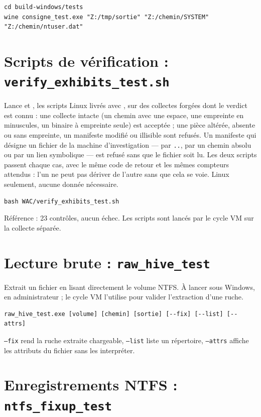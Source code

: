 \documentclass[11pt,a4paper,oneside]{report}
\begin{document}
\begin{lstlisting}
cd build-windows/tests
wine consigne_test.exe "Z:/tmp/sortie" "Z:/chemin/SYSTEM" "Z:/chemin/ntuser.dat"
\end{lstlisting}

\section{Scripts de vérification : \texttt{verify\_exhibits\_test.sh}}

Lance  et , les
scripts Linux livrés avec , sur des collectes forgées dont le
verdict est connu : une collecte intacte (un chemin avec une espace, une
empreinte en minuscules, un binaire à empreinte seule) est acceptée ; une pièce
altérée, absente ou sans empreinte, un manifeste modifié ou illisible sont
refusés. Un manifeste qui désigne un fichier de la machine d'investigation —
par \texttt{..}, par un chemin absolu ou par un lien symbolique — est refusé
sans que le fichier soit lu. Les deux scripts passent chaque cas, avec le même
code de retour et les mêmes compteurs attendus : l'un ne peut pas dériver de
l'autre sans que cela se voie. Linux seulement, aucune donnée nécessaire.

\begin{lstlisting}
bash WAC/verify_exhibits_test.sh
\end{lstlisting}

Référence : 23 contrôles, aucun échec. Les scripts  sont lancés
par le cycle VM sur la collecte séparée.

\section{Lecture brute : \texttt{raw\_hive\_test}}

Extrait un fichier en lisant directement le volume NTFS. À lancer sous Windows,
en administrateur ; le cycle VM l'utilise pour valider l'extraction d'une ruche.

\begin{lstlisting}
raw_hive_test.exe [volume] [chemin] [sortie] [--fix] [--list] [--attrs]
\end{lstlisting}

\texttt{--fix} rend la ruche extraite chargeable, \texttt{--list} liste un
répertoire, \texttt{--attrs} affiche les attributs  du fichier
sans les interpréter.

\section{Enregistrements NTFS : \texttt{ntfs\_fixup\_test}}
\end{document}
